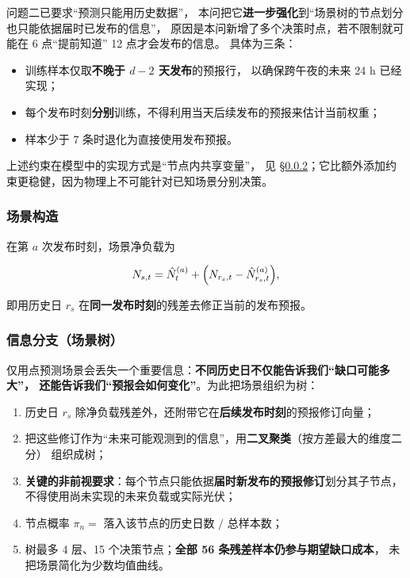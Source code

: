 问题二已要求“预测只能用历史数据”，
本问把它\textbf{进一步强化}到“场景树的节点划分也只能依据届时已发布的信息”，
原因是本问新增了多个决策时点，若不限制就可能在 6 点“提前知道” 12 点才会发布的信息。
具体为三条：
\begin{itemize}[itemsep=2pt,topsep=3pt]
  \item 训练样本仅取\textbf{不晚于 $d-2$ 天发布}的预报行，
        以确保跨午夜的未来 24 h 已经实现；
  \item 每个发布时刻\textbf{分别}训练，不得利用当天后续发布的预报来估计当前权重；
  \item 样本少于 7 条时退化为直接使用发布预报。
\end{itemize}

\noindent 上述约束在模型中的实现方式是“节点内共享变量”，
见 \S\ref{sec:q3-tree}；它比额外添加约束更稳健，因为物理上不可能针对已知场景分别决策。

\subsubsection{场景构造}

在第 $a$ 次发布时刻，场景净负载为

\begin{equation}
N_{s,t}=\hat N_t^{(a)}+\Bigl(N_{r_s,t}-\hat N_{r_s,t}^{(a)}\Bigr),
\label{eq:q3-scen}
\end{equation}

即用历史日 $r_s$ 在\textbf{同一发布时刻}的残差去修正当前的发布预报。

\subsubsection{信息分支（场景树）}
\label{sec:q3-tree}

仅用点预测场景会丢失一个重要信息：\textbf{不同历史日不仅能告诉我们“缺口可能多大”，
还能告诉我们“预报会如何变化”}。为此把场景组织为树：

\begin{enumerate}[itemsep=3pt,topsep=3pt]
  \item 历史日 $r_s$ 除净负载残差外，还附带它在\textbf{后续发布时刻}的预报修订向量；
  \item 把这些修订作为“未来可能观测到的信息”，用\textbf{二叉聚类}（按方差最大的维度二分）
        组织成树；
  \item \textbf{关键的非前视要求}：每个节点只能依据\textbf{届时新发布的预报修订}划分其子节点，
        不得使用尚未实现的未来负载或实际光伏；
  \item 节点概率 $\pi_n=$ 落入该节点的历史日数 $/$ 总样本数；
  \item 树最多 4 层、15 个决策节点；\textbf{全部 56 条残差样本仍参与期望缺口成本}，
        未把场景简化为少数均值曲线。
\end{enumerate}

